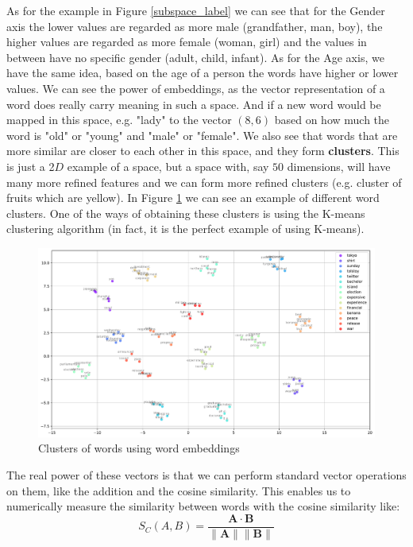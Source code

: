 \documentclass[12pt]{article}
\numberwithin{equation}{section}
\begin{document}
\begin{spacing}{1.5}
	As for the example in Figure \ref{subspace_label} we can see that for the Gender axis the lower values are regarded as more male (grandfather, man, boy), the higher values are regarded as more female (woman, girl) and the values in between have no specific gender (adult, child, infant). As for the Age axis, we have the same idea, based on the age of a person the words have higher or lower values. We can see the power of embeddings, as the vector representation of a word does really carry meaning in such a space. And if a new word would be mapped in this space, e.g. "lady" to the vector $(8, 6)$ based on how much the word is "old" or "young" and "male" or "female". We also see that words that are more similar are closer to each other in this space, and they form \textbf{clusters}. This is just a 2$D$ example of a space, but a space with, say $50$ dimensions, will have many more refined features and we can form more refined clusters (e.g. cluster of fruits which are yellow). In Figure \ref{cluster} we can see an example of different word clusters. One of the ways of obtaining these clusters is using the K-means clustering algorithm (in fact, it is the perfect example of using K-means). 
	\begin{figure}[H]
		\centering

		\includegraphics[scale=0.50]{clusters}		
		\caption{Clusters of words using word embeddings}
		\label{cluster}
	\end{figure}
	
	The real power of these vectors is that we can perform standard vector operations on them, like the addition and the cosine similarity. This enables us to numerically measure the similarity between words with the cosine similarity like:
	\begin{equation}\label{cosine_similarity}
		S_C(A, B) = \frac{\mathbf{A}\cdot \mathbf{B}}{\|\mathbf{A}\| \| \mathbf{B}\|}
	\end{equation}


\end{spacing}
\end{document}
